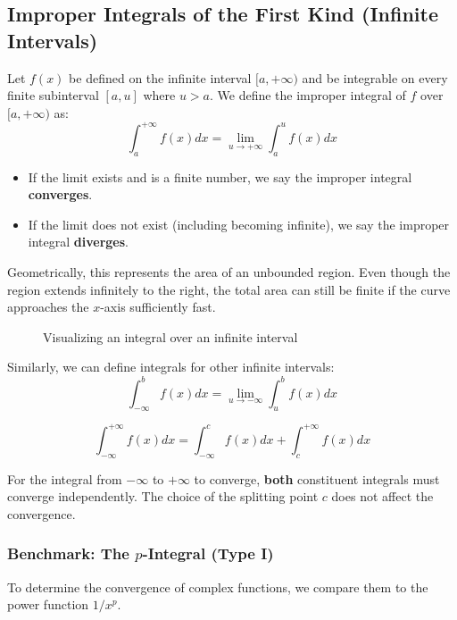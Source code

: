 \subsection{Improper Integrals of the First Kind (Infinite Intervals)}

\begin{definition}
Let $f(x)$ be defined on the infinite interval $[a, +\infty)$ and be integrable on every finite subinterval $[a, u]$ where $u > a$. We define the improper integral of $f$ over $[a, +\infty)$ as:
\[
\int_a^{+\infty} f(x) dx = \lim_{u \to +\infty} \int_a^u f(x) dx
\]

\begin{itemize}
    \item If the limit exists and is a finite number, we say the improper integral \textbf{converges}.
    \item If the limit does not exist (including becoming infinite), we say the improper integral \textbf{diverges}.
\end{itemize}
\end{definition}
Geometrically, this represents the area of an unbounded region. Even though the region extends infinitely to the right, the total area can still be finite if the curve approaches the $x$-axis sufficiently fast.
\begin{figure}[htbp]
\centering
{}
\caption{Visualizing an integral over an infinite interval}
\end{figure}

Similarly, we can define integrals for other infinite intervals:
\[
\int_{-\infty}^b f(x) dx = \lim_{u \to -\infty} \int_u^b f(x) dx
\]

\[
\int_{-\infty}^{+\infty} f(x) dx = \int_{-\infty}^c f(x) dx + \int_c^{+\infty} f(x) dx
\]

For the integral from $-\infty$ to $+\infty$ to converge, \textbf{both} constituent integrals must converge independently. The choice of the splitting point $c$ does not affect the convergence.
\subsubsection{Benchmark: The \texorpdfstring{$p$}{p}-Integral (Type I)}
To determine the convergence of complex functions, we compare them to the power function $1/x^p$.

